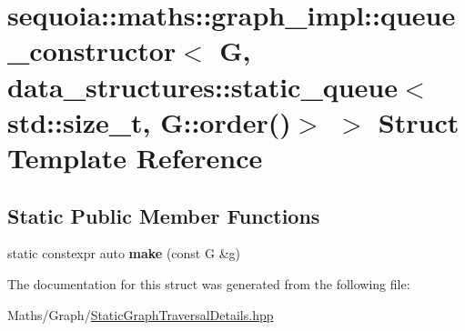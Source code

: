 \hypertarget{structsequoia_1_1maths_1_1graph__impl_1_1queue__constructor_3_01_g_00_01data__structures_1_1stat5f20acd170cf120ad5a48953f8d5a86b}{}\section{sequoia\+::maths\+::graph\+\_\+impl\+::queue\+\_\+constructor$<$ G, data\+\_\+structures\+::static\+\_\+queue$<$ std\+::size\+\_\+t, G\+::order()$>$ $>$ Struct Template Reference}
\label{structsequoia_1_1maths_1_1graph__impl_1_1queue__constructor_3_01_g_00_01data__structures_1_1stat5f20acd170cf120ad5a48953f8d5a86b}
\subsection*{Static Public Member Functions}
\begin{DoxyCompactItemize}
\item 
\mbox{\label{structsequoia_1_1maths_1_1graph__impl_1_1queue__constructor_3_01_g_00_01data__structures_1_1stat5f20acd170cf120ad5a48953f8d5a86b_a3c4a0ad619aa3b53caa1ae331195b8cb}} 
static constexpr auto {\bfseries make} (const G \&g)
\end{DoxyCompactItemize}


The documentation for this struct was generated from the following file\+:\begin{DoxyCompactItemize}
\item 
Maths/\+Graph/\mbox{\hyperlink{_static_graph_traversal_details_8hpp}{Static\+Graph\+Traversal\+Details.\+hpp}}\end{DoxyCompactItemize}
